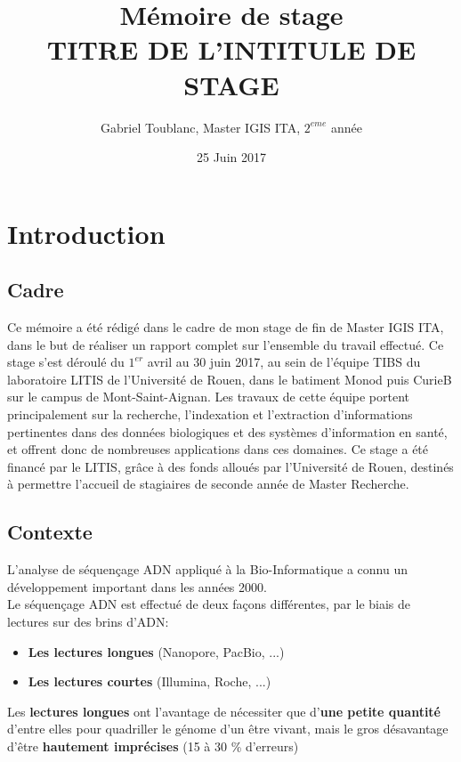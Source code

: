 \documentclass{report}
\title{Mémoire de stage\\
TITRE DE L'INTITULE DE STAGE}
\author{Gabriel Toublanc, Master IGIS ITA, $2^{eme}$ année}
\date{25 Juin 2017}
\begin{document}
  \LinesNumbered
  \maketitle\newpage
  \tableofcontents\newpage
  \chapter{Introduction}
    \section{Cadre}
      Ce mémoire a été rédigé dans le cadre de mon stage de fin de Master IGIS ITA, dans le but de réaliser un rapport complet sur l'ensemble du travail effectué. Ce stage s'est déroulé du $1^{er}$ avril au 30 juin 2017, au sein de l'équipe TIBS du laboratoire LITIS de l'Université de Rouen, dans le batiment Monod puis CurieB sur le campus de Mont-Saint-Aignan. Les travaux de
      cette équipe portent principalement sur la recherche, l’indexation et l’extraction d’informations
      pertinentes dans des données biologiques et des systèmes d’information en santé,
      et offrent donc de nombreuses applications dans ces domaines. Ce stage a été financé par le
      LITIS, grâce à des fonds alloués par l’Université de Rouen, destinés à permettre l’accueil
      de stagiaires de seconde année de Master Recherche.
    \section{Contexte}
      L'analyse de séquençage ADN appliqué à la Bio-Informatique a connu un développement important dans les années 2000.\\
      Le séquençage ADN est effectué de deux façons différentes, par le biais de lectures sur des brins d'ADN:
      \begin{itemize}
        \setlength{\itemindent}{30mm}
        \renewcommand{\labelitemi}{$\longrightarrow$}
        \item \textbf{Les lectures longues} (Nanopore, PacBio, ...)
        \item \textbf{Les lectures courtes} (Illumina, Roche, ...)
      \end{itemize}
      Les \textbf{lectures longues} ont l'avantage de nécessiter que d'\textbf{une petite quantité} d'entre elles pour quadriller le génome d'un être vivant, mais le gros désavantage d'être \textbf{hautement imprécises} (15 à 30 \% d'erreurs)\\
\end{document}
